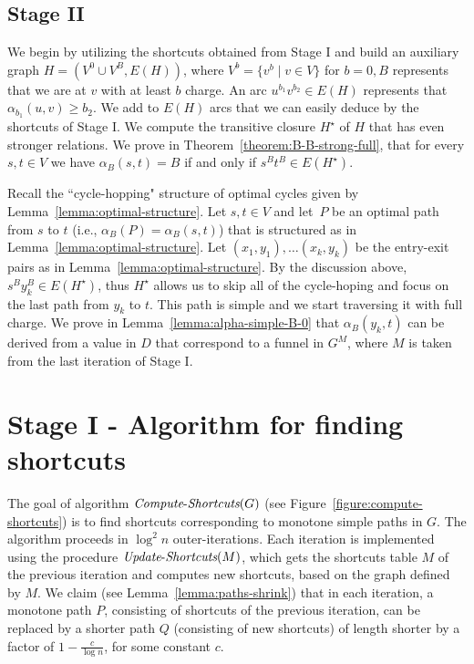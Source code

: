 \documentclass[11pt]{article}
\newcommand{\ComputeS}{\mbox{{\it Compute}-{\it Shortcuts}}}
\newcommand{\UpdateS}{\mbox{{\it Update}-{\it Shortcuts}}}
\begin{document}
\subsection{Stage II}
We begin by utilizing the shortcuts obtained from Stage I and build an auxiliary graph $H = (V^0 \cup V^B, E(H))$, where $V^b = \{v^b \mid v\in V \}$ for $b=0,B$ represents that we are at $v$ with at least $b$ charge.  An arc $u^{b_1}v^{b_2}\in E(H)$ represents that $\alpha_{b_1}(u,v)\ge b_2$. We add to $E(H)$ arcs that we can easily deduce by the shortcuts of Stage I. We compute the transitive closure $H^\star$  of $H$ that has even stronger relations. 
We prove in Theorem~\ref{theorem:B-B-strong-full}, that for every $s,t\in V$ we have $\alpha_B(s,t)=B$ if and only if $s^B t^B \in E(H^\star)$.

Recall the ``cycle-hopping" structure of optimal cycles given by Lemma~\ref{lemma:optimal-structure}. Let $s,t\in V$ and let~$P$ be an optimal path from $s$ to $t$ (i.e., $\alpha_B(P)=\alpha_B(s,t)$) that is structured as in Lemma~\ref{lemma:optimal-structure}. Let $(x_1,y_1),\ldots (x_k,y_k)$  be the entry-exit pairs as in Lemma~\ref{lemma:optimal-structure}. By the  discussion above, $s^B y_k^B \in E(H^\star)$, thus $H^\star$ allows us to skip all of the cycle-hoping and focus on the last path from $y_k$ to $t$. This path is simple and we start traversing it with  full charge. We prove in Lemma~\ref{lemma:alpha-simple-B-0} that $\alpha_B(y_k,t)$ can be derived from a value in $D$ that correspond to a funnel in $G^M$, where $M$ is taken from the last iteration of Stage I.

\section{Stage I - Algorithm for finding 
shortcuts}\label{S-shortucts}
The goal of algorithm $\ComputeS(G)$  (see Figure~\ref{figure:compute-shortcuts}) is to find shortcuts corresponding to monotone simple paths in $G$. The algorithm proceeds in $\log^2 n$ outer-iterations. Each iteration is implemented using the procedure $\UpdateS(M)$, which gets the shortcuts table $M$ of the previous iteration and computes new shortcuts, based on the graph defined by $M$. We claim (see Lemma~\ref{lemma:paths-shrink}) that in each iteration, a monotone path $P$, consisting of shortcuts of the previous iteration, can be replaced by a shorter path $Q$ (consisting of new shortcuts) of length shorter by a factor of $1-\frac{c}{\log n}$, for some constant $c$.
\end{document}

